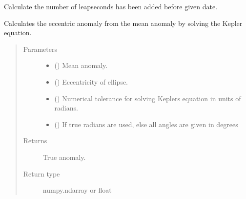 \documentclass[letterpaper,10pt,english]{sphinxmanual}
\begin{document}

\begin{fulllineitems}
\label{\detokenize{modules/dpt_tools:dpt_tools.leapseconds_before}}
Calculate the number of leapseconds has been added before given date.

\end{fulllineitems}


\begin{fulllineitems}
\label{\detokenize{modules/dpt_tools:dpt_tools.mean2eccentric}}
Calculates the eccentric anomaly from the mean anomaly by solving the Kepler equation.
\begin{quote}\begin{description}
\item[{Parameters}] \leavevmode\begin{itemize}
\item {} 
 () \textendash{} Mean anomaly.

\item {} 
 () \textendash{} Eccentricity of ellipse.

\item {} 
 () \textendash{} Numerical tolerance for solving Keplers equation in units of radians.

\item {} 
 () \textendash{} If true radians are used, else all angles are given in degrees

\end{itemize}

\item[{Returns}] \leavevmode
True anomaly.

\item[{Return type}] \leavevmode
numpy.ndarray or float


\end{description}
\end{quote}
\end{fulllineitems}
\end{document}
